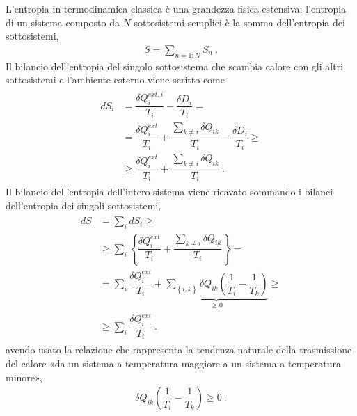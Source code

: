 \documentclass[letterpaper,10pt,italian]{jupyterBook}
\begin{document}
\sphinxAtStartPar
L’entropia in termodinamica classica è una grandezza fisica estensiva: l’entropia di un sistema composto da \(N\) sotto\sphinxhyphen{}sistemi semplici è la somma dell’entropia dei sotto\sphinxhyphen{}sistemi,
\begin{equation*}
\begin{split}S = \sum_{n=1:N} S_n \ .\end{split}
\end{equation*}
\sphinxAtStartPar
Il bilancio dell’entropia del singolo sotto\sphinxhyphen{}sistema che scambia calore con gli altri sotto\sphinxhyphen{}sistemi e l’ambiente esterno viene scritto come
\begin{equation*}
\begin{split}\begin{aligned}
    dS_i & = \dfrac{\delta Q^{ext,i}_i}{T_i} - \dfrac{\delta D_i}{T_i} = \\
         & = \dfrac{\delta Q^{ext}_i}{T_i} + \dfrac{\sum_{k \ne i} \delta Q_{ik}}{T_i} - \dfrac{\delta D_i}{T_i} \ge \\
         & \ge \dfrac{\delta Q^{ext}_i}{T_i} + \dfrac{\sum_{k \ne i} \delta Q_{ik}}{T_i} \ . 
  \end{aligned}\end{split}
\end{equation*}
\sphinxAtStartPar
Il bilancio dell’entropia dell’intero sistema viene ricavato sommando i bilanci dell’entropia dei singoli sotto\sphinxhyphen{}sistemi,
\begin{equation*}
\begin{split}\begin{aligned}
    dS & = \sum_i d S_i \ge \\
       & \ge \sum_i \left\{ \dfrac{\delta Q^{ext}_i}{T_i} + \dfrac{\sum_{k \ne i} \delta Q_{ik}}{T_i} \right\} = \\
       & = \sum_i \dfrac{\delta Q^{ext}_i}{T_i} + \underbrace{\sum_{\left\{i,k\right\}} \delta Q_{ik} \left( \dfrac{1}{T_i} - \dfrac{1}{T_k} \right)}_{\ge 0} \ge \\
       & \ge \sum_i \dfrac{\delta Q^{ext}_i}{T_i} \ . 
  \end{aligned}\end{split}
\end{equation*}
\sphinxAtStartPar
avendo usato la relazione che rappresenta la tendenza naturale della trasmissione del calore «da un sistema a temperatura maggiore a un sistema a temperatura minore»,
\begin{equation*}
\begin{split}\delta Q_{ik} \left( \dfrac{1}{T_i} - \dfrac{1}{T_k} \right) \ge 0 \ .\end{split}
\end{equation*}
\sphinxAtStartPar
{} 
\end{document}
